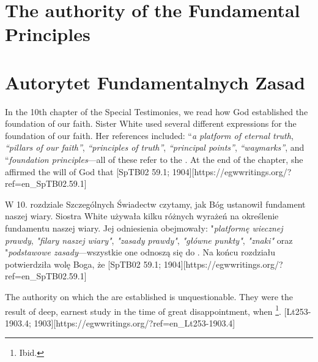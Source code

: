 \chapter{The authority of the Fundamental Principles} \label{chap:authority}


\chapter{Autorytet Fundamentalnych Zasad} \label{chap:authority}


In the 10th chapter of the Special Testimonies, we read how God established the foundation of our faith. Sister White used several different expressions for the foundation of our faith. Her references included: “\textit{a platform of eternal truth}, \textit{“pillars of our faith”}, \textit{“principles of truth”}, \textit{“principal points”}, \textit{“waymarks”}, and “\textit{foundation principles}—all of these refer to the . At the end of the chapter, she affirmed the will of God that [SpTB02 59.1; 1904][https://egwwritings.org/?ref=en\_SpTB02.59.1]


W 10. rozdziale Szczególnych Świadectw czytamy, jak Bóg ustanowił fundament naszej wiary. Siostra White używała kilku różnych wyrażeń na określenie fundamentu naszej wiary. Jej odniesienia obejmowały: "\textit{platformę wiecznej prawdy}, \textit{"filary naszej wiary"}, \textit{"zasady prawdy"}, \textit{"główne punkty"}, \textit{"znaki"} oraz "\textit{podstawowe zasady}—wszystkie one odnoszą się do . Na końcu rozdziału potwierdziła wolę Boga, że [SpTB02 59.1; 1904][https://egwwritings.org/?ref=en\_SpTB02.59.1]


The authority on which the  are established is unquestionable. They were the result of deep, earnest study in the time of great disappointment, when \footnote{Ibid.}. [Lt253-1903.4; 1903][https://egwwritings.org/?ref=en\_Lt253-1903.4]


